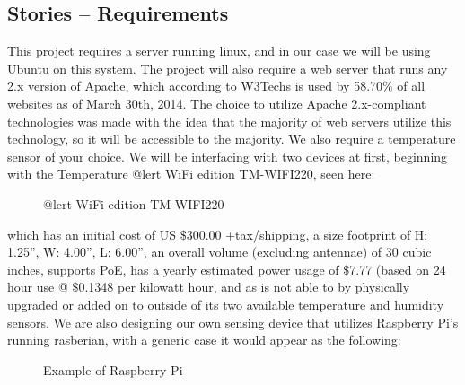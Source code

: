 \documentclass{report}
\begin{document}
\subsection*{Stories -- Requirements}
This project requires a server running linux, and in our case we will be using Ubuntu on this system. The project will also require a web server that runs any 2.x version of Apache, which according to W3Techs is used by 58.70$\%$ of all websites as of March 30th, 2014.  The choice to utilize Apache 2.x-compliant technologies was made with the idea that the majority of web servers utilize this technology, so it will be accessible to the majority. We also require a temperature sensor of your choice. We will be interfacing with two devices at first, beginning with the Temperature @lert WiFi edition TM-WIFI220, seen here:
\begin{figure}[H]
\caption{@lert WiFi edition TM-WIFI220}
\end{figure}
 which has an initial cost of US $\$$300.00 +tax/shipping, a size footprint of H: 1.25”, W: 4.00”, L: 6.00”, an overall volume (excluding antennae) of 30 cubic inches, supports PoE, has a yearly estimated power usage of $\$$7.77 (based on 24 hour use @ $\$$0.1348 per kilowatt hour, and as is not able to by physically upgraded or added on to outside of its two available temperature and humidity sensors.
\newline
\indent
We are also designing our own sensing device that utilizes Raspberry Pi’s running rasberian, with a generic case it would appear as the following:
\begin{figure}[H]
\caption{Example of Raspberry Pi}
\end{figure}
\end{document}

